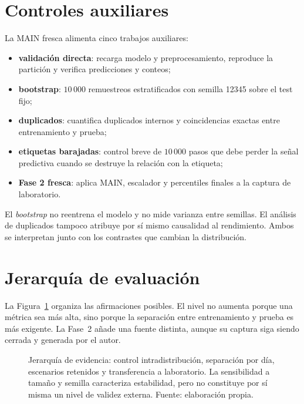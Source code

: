\section{Controles auxiliares}

La MAIN fresca alimenta cinco trabajos auxiliares:

\begin{itemize}[leftmargin=*]
    \item \textbf{validación directa}: recarga modelo y preprocesamiento, reproduce la partición y verifica predicciones y conteos;
    \item \textbf{bootstrap}: $10\,000$ remuestreos estratificados con semilla 12345 sobre el test fijo;
    \item \textbf{duplicados}: cuantifica duplicados internos y coincidencias exactas entre entrenamiento y prueba;
    \item \textbf{etiquetas barajadas}: control breve de $10\,000$ pasos que debe perder la señal predictiva cuando se destruye la relación con la etiqueta;
    \item \textbf{Fase 2 fresca}: aplica MAIN, escalador y percentiles finales a la captura de laboratorio.
\end{itemize}

El \emph{bootstrap} no reentrena el modelo y no mide varianza entre semillas. El análisis de duplicados tampoco atribuye por sí mismo causalidad al rendimiento. Ambos se interpretan junto con los contrastes que cambian la distribución.

\section{Jerarquía de evaluación}

La Figura~\ref{fig:escalera-validacion} organiza las afirmaciones posibles. El nivel no aumenta porque una métrica sea más alta, sino porque la separación entre entrenamiento y prueba es más exigente. La Fase~2 añade una fuente distinta, aunque su captura siga siendo cerrada y generada por el autor.

\begin{figure}[htbp]
\centering
\resizebox{\textwidth}{!}{}
\caption[Jerarquía de evaluación y generalización]{Jerarquía de evidencia: control intradistribución, separación por día, escenarios retenidos y transferencia a laboratorio. La sensibilidad a tamaño y semilla caracteriza estabilidad, pero no constituye por sí misma un nivel de validez externa. Fuente: elaboración propia.}
\label{fig:escalera-validacion}
\end{figure}

